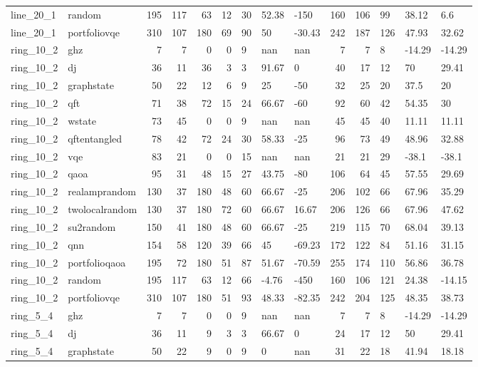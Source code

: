 \begin{longtable}{llrrrrlllrrlll}
line\_20\_1 & random & 195 & 117 & 63 & 12 & 30 & 52.38 & -150 & 160 & 106 & 99 & 38.12 & 6.6 \\
line\_20\_1 & portfoliovqe & 310 & 107 & 180 & 69 & 90 & 50 & -30.43 & 242 & 187 & 126 & 47.93 & 32.62 \\
ring\_10\_2 & ghz & 7 & 7 & 0 & 0 & 9 & nan & nan & 7 & 7 & 8 & -14.29 & -14.29 \\
ring\_10\_2 & dj & 36 & 11 & 36 & 3 & 3 & 91.67 & 0 & 40 & 17 & 12 & 70 & 29.41 \\
ring\_10\_2 & graphstate & 50 & 22 & 12 & 6 & 9 & 25 & -50 & 32 & 25 & 20 & 37.5 & 20 \\
ring\_10\_2 & qft & 71 & 38 & 72 & 15 & 24 & 66.67 & -60 & 92 & 60 & 42 & 54.35 & 30 \\
ring\_10\_2 & wstate & 73 & 45 & 0 & 0 & 9 & nan & nan & 45 & 45 & 40 & 11.11 & 11.11 \\
ring\_10\_2 & qftentangled & 78 & 42 & 72 & 24 & 30 & 58.33 & -25 & 96 & 73 & 49 & 48.96 & 32.88 \\
ring\_10\_2 & vqe & 83 & 21 & 0 & 0 & 15 & nan & nan & 21 & 21 & 29 & -38.1 & -38.1 \\
ring\_10\_2 & qaoa & 95 & 31 & 48 & 15 & 27 & 43.75 & -80 & 106 & 64 & 45 & 57.55 & 29.69 \\
ring\_10\_2 & realamprandom & 130 & 37 & 180 & 48 & 60 & 66.67 & -25 & 206 & 102 & 66 & 67.96 & 35.29 \\
ring\_10\_2 & twolocalrandom & 130 & 37 & 180 & 72 & 60 & 66.67 & 16.67 & 206 & 126 & 66 & 67.96 & 47.62 \\
ring\_10\_2 & su2random & 150 & 41 & 180 & 48 & 60 & 66.67 & -25 & 219 & 115 & 70 & 68.04 & 39.13 \\
ring\_10\_2 & qnn & 154 & 58 & 120 & 39 & 66 & 45 & -69.23 & 172 & 122 & 84 & 51.16 & 31.15 \\
ring\_10\_2 & portfolioqaoa & 195 & 72 & 180 & 51 & 87 & 51.67 & -70.59 & 255 & 174 & 110 & 56.86 & 36.78 \\
ring\_10\_2 & random & 195 & 117 & 63 & 12 & 66 & -4.76 & -450 & 160 & 106 & 121 & 24.38 & -14.15 \\
ring\_10\_2 & portfoliovqe & 310 & 107 & 180 & 51 & 93 & 48.33 & -82.35 & 242 & 204 & 125 & 48.35 & 38.73 \\
ring\_5\_4 & ghz & 7 & 7 & 0 & 0 & 9 & nan & nan & 7 & 7 & 8 & -14.29 & -14.29 \\
ring\_5\_4 & dj & 36 & 11 & 9 & 3 & 3 & 66.67 & 0 & 24 & 17 & 12 & 50 & 29.41 \\
ring\_5\_4 & graphstate & 50 & 22 & 9 & 0 & 9 & 0 & nan & 31 & 22 & 18 & 41.94 & 18.18 \\

\end{longtable}
